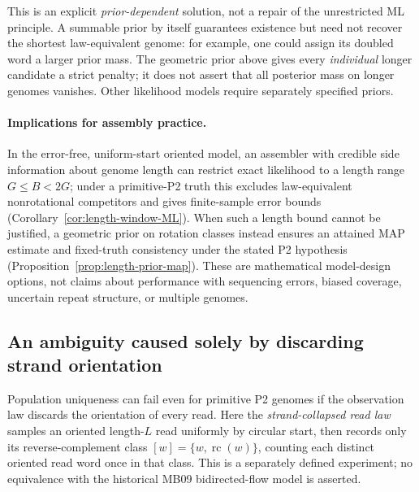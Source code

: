 This is an explicit \emph{prior-dependent} solution,
not a repair of the unrestricted ML principle.
A summable prior by itself guarantees existence
but need not recover the shortest law-equivalent
genome: for example, one could assign its doubled
word a larger prior mass. The geometric prior
above gives every \emph{individual} longer candidate
a strict penalty; it does not assert that all
posterior mass on longer genomes vanishes.
Other likelihood models require separately specified priors.

\paragraph{Implications for assembly practice.}
In the error-free, uniform-start oriented model, an assembler with
credible side information about genome length can restrict
exact likelihood to a length range $G\le B<2G$; under a primitive-P2
truth this excludes law-equivalent nonrotational competitors and
gives finite-sample error bounds (Corollary~\ref{cor:length-window-ML}).
When such a length bound cannot be justified, a geometric prior
on rotation classes instead ensures an attained MAP estimate and
fixed-truth consistency under the stated P2 hypothesis
(Proposition~\ref{prop:length-prior-map}). These are mathematical
model-design options, not claims about performance with sequencing
errors, biased coverage, uncertain repeat structure, or multiple genomes.

\subsection{An ambiguity caused solely by discarding strand orientation}
\label{sec:rc-class-ambiguity}

Population uniqueness can fail even for primitive P2 genomes if
the observation law discards the orientation of every read.
Here the \emph{strand-collapsed read law} samples an oriented
length-$L$ read uniformly by circular start, then records only
its reverse-complement class
$[w]=\{w,\operatorname{rc}(w)\}$, counting each distinct
oriented read word once in that class.
This is a separately defined experiment; no equivalence with
the historical MB09 bidirected-flow model is asserted.

